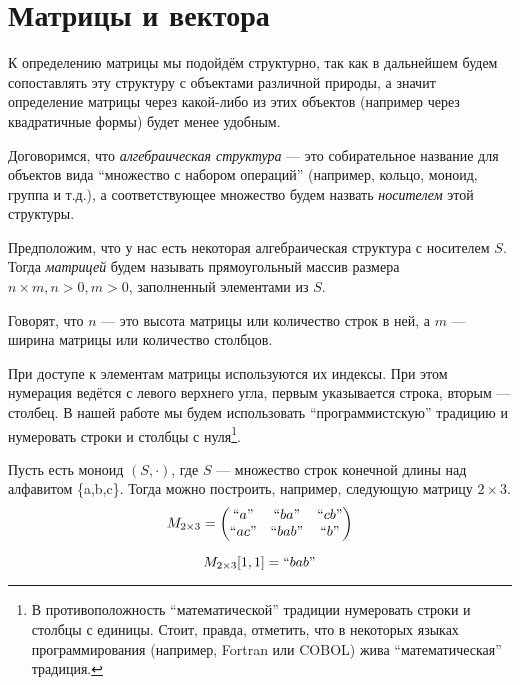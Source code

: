 \section{Матрицы и вектора}

К определению матрицы мы подойдём структурно, так как в дальнейшем будем сопоставлять эту структуру с объектами различной природы, а значит определение матрицы через какой-либо из этих объектов (например через квадратичные формы) будет менее удобным.

Договоримся, что \textit{алгебраическая структура} --- это собирательное название для объектов вида ``множество с набором операций'' (например, кольцо, моноид, группа и т.д.), а соответствующее множество будем назвать \textit{носителем} этой структуры.

\begin{definition}

Предположим, что у нас есть некоторая алгебраическая структура с носителем $S$. Тогда \emph{матрицей} будем называть прямоугольный массив размера $n\times m, n > 0, m > 0$, заполненный элементами из $S$.

Говорят, что $n$ --- это высота матрицы или количество строк в ней, а $m$ --- ширина матрицы или количество столбцов.

\end{definition}

При доступе к элементам матрицы используются их индексы. При этом нумерация ведётся с левого верхнего угла, первым указывается строка, вторым --- столбец. В нашей работе мы будем использовать ``программистскую'' традицию и нумеровать строки и столбцы с нуля\footnote{В противоположность ``математической'' традиции нумеровать строки и столбцы с единицы. Стоит, правда, отметить, что в некоторых языках программирования (например, Fortran или COBOL) жива ``математическая'' традиция.}.

\begin{example}[Матрица]

Пусть есть моноид $(S,\cdot)$, где $S$ --- множество строк конечной длины над алфавитом \{a,b,c\}.
Тогда можно построить, например, следующую матрицу $2\times 3$.
$$
M_{2\times 3} =
\begin{pmatrix}
``a" & ``ba" & ``cb" \\
``ac" & ``bab" & ``b" \\
\end{pmatrix}
$$

$$
M_{2\times 3}[1,1] = ``bab"
$$

\end{example}

